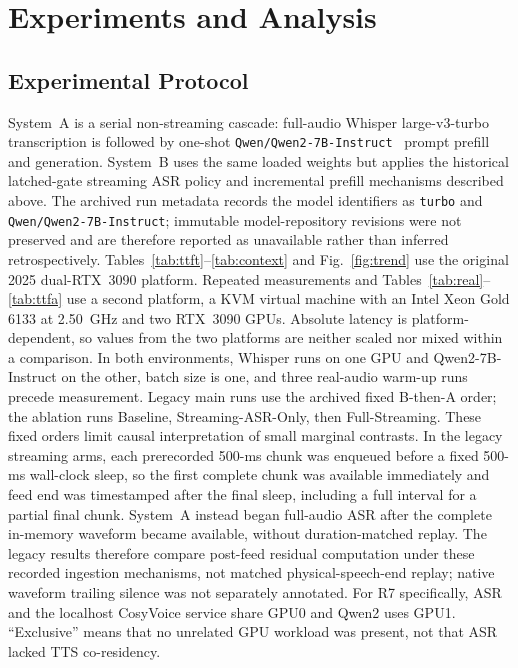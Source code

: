\documentclass[conference]{IEEEtran}
\begin{document}
\section{Experiments and Analysis}\label{sec:experiments}

\subsection{Experimental Protocol}

System~A is a serial non-streaming cascade: full-audio Whisper large-v3-turbo transcription is followed by one-shot \texttt{Qwen/Qwen2-7B-Instruct}~\cite{ref20} prompt prefill and generation. System~B uses the same loaded weights but applies the historical latched-gate streaming ASR policy and incremental prefill mechanisms described above. The archived run metadata records the model identifiers as \texttt{turbo} and \texttt{Qwen/Qwen2-7B-Instruct}; immutable model-repository revisions were not preserved and are therefore reported as unavailable rather than inferred retrospectively. Tables~\ref{tab:ttft}--\ref{tab:context} and Fig.~\ref{fig:trend} use the original 2025 dual-RTX~3090 platform. Repeated measurements and Tables~\ref{tab:real}--\ref{tab:ttfa} use a second platform, a KVM virtual machine with an Intel Xeon Gold 6133 at 2.50~GHz and two RTX~3090 GPUs. Absolute latency is platform-dependent, so values from the two platforms are neither scaled nor mixed within a comparison. In both environments, Whisper runs on one GPU and Qwen2-7B-Instruct on the other, batch size is one, and three real-audio warm-up runs precede measurement. Legacy main runs use the archived fixed B-then-A order; the ablation runs Baseline, Streaming-ASR-Only, then Full-Streaming. These fixed orders limit causal interpretation of small marginal contrasts. In the legacy streaming arms, each prerecorded 500-ms chunk was enqueued before a fixed 500-ms wall-clock sleep, so the first complete chunk was available immediately and feed end was timestamped after the final sleep, including a full interval for a partial final chunk. System~A instead began full-audio ASR after the complete in-memory waveform became available, without duration-matched replay. The legacy results therefore compare post-feed residual computation under these recorded ingestion mechanisms, not matched physical-speech-end replay; native waveform trailing silence was not separately annotated. For R7 specifically, ASR and the localhost CosyVoice service share GPU0 and Qwen2 uses GPU1. ``Exclusive'' means that no unrelated GPU workload was present, not that ASR lacked TTS co-residency.
\end{document}
